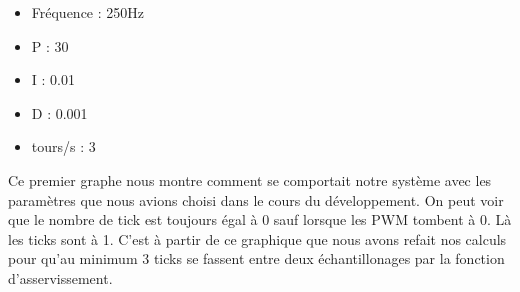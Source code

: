 \documentclass[
	a4paper,									%
	11pt,										%
	twoside,									%
	openright,									%
	notitlepage,									%
	parskip=half,								%
]{scrreprt}										%
\begin{document}
\begin{center}
    



\begin{itemize}
    \item Fréquence : 250Hz
    \item P : 30
    \item I : 0.01
    \item D : 0.001
    \item tours/s : 3
\end{itemize}
\end{center}

Ce premier graphe nous montre comment se comportait notre système avec les paramètres que nous avions choisi dans le cours 
du développement. On peut voir que le nombre de tick est toujours égal à 0 sauf lorsque les PWM tombent à 0. Là les ticks sont
à 1. C'est à partir de ce graphique que nous avons refait nos calculs pour qu'au minimum 3 ticks se fassent entre deux 
échantillonages par la fonction d'asservissement. \par
\end{document}
